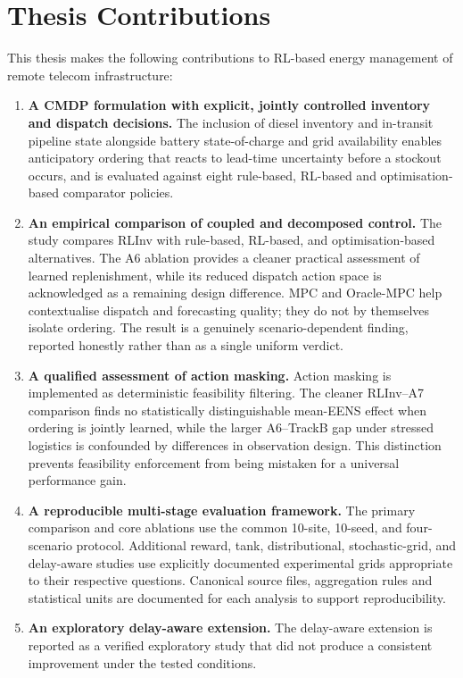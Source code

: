 \section{Thesis Contributions}
\label{sec:conclusion_contributions}

This thesis makes the following contributions to RL-based energy
management of remote telecom infrastructure:

\begin{enumerate}

  \item \textbf{A CMDP formulation with explicit, jointly controlled
  inventory and dispatch decisions.} The inclusion of diesel inventory
  and in-transit pipeline state alongside battery state-of-charge and
  grid availability enables anticipatory ordering that reacts to
  lead-time uncertainty before a stockout occurs, and is evaluated
  against eight rule-based, RL-based and optimisation-based comparator
  policies.

  \item \textbf{An empirical comparison of coupled and decomposed
  control.} The study compares RLInv with rule-based, RL-based, and
  optimisation-based alternatives. The A6 ablation provides a cleaner
  practical assessment of learned replenishment, while its reduced
  dispatch action space is acknowledged as a remaining design
  difference. MPC and Oracle-MPC help contextualise dispatch and
  forecasting quality; they do not by themselves isolate ordering. The
  result is a genuinely
  scenario-dependent finding, reported honestly rather than as a single
  uniform verdict.

  \item \textbf{A qualified assessment of action masking.} Action
  masking is implemented as deterministic feasibility filtering. The
  cleaner RLInv--A7 comparison finds no statistically distinguishable
  mean-EENS effect when ordering is jointly learned, while the larger
  A6--TrackB gap under stressed logistics is confounded by differences
  in observation design. This distinction prevents feasibility
  enforcement from being mistaken for a universal performance gain.

  \item \textbf{A reproducible multi-stage evaluation framework.} The
  primary comparison and core ablations use the common 10-site,
  10-seed, and four-scenario protocol. Additional reward, tank,
  distributional, stochastic-grid, and delay-aware studies use
  explicitly documented experimental grids appropriate to their
  respective questions. Canonical source files, aggregation rules and
  statistical units are documented for each analysis to support
  reproducibility.

  \item \textbf{An exploratory delay-aware extension.} The
  delay-aware extension is reported as a verified exploratory study
  that did not produce a consistent improvement under the tested
  conditions.

\end{enumerate}

